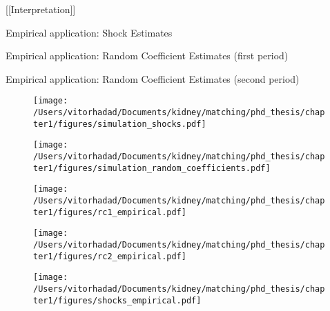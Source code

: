 [[Interpretation]]

\begin{table}[H]
  \singlespacing
  \caption{Empirical application: Shock Estimates}
  
\end{table}

\begin{table}[H]
  \singlespacing
  \caption{Empirical application: Random Coefficient Estimates (first period)}
  
\end{table}

\begin{table}[H]
  \singlespacing
  \caption{Empirical application: Random Coefficient Estimates (second period)}
  
\end{table}




\begin{figure}
  \centering
  \texttt{[image: /Users/vitorhadad/Documents/kidney/matching/phd\_thesis/chapter1/figures/simulation\_shocks.pdf]}
  \label{fig:simulation_shocks}
\end{figure}

\begin{figure}
  \centering
  \texttt{[image: /Users/vitorhadad/Documents/kidney/matching/phd\_thesis/chapter1/figures/simulation\_random\_coefficients.pdf]}
  \label{fig:simulation_random_coefficients}
\end{figure}


\begin{figure}
  \centering
  \texttt{[image: /Users/vitorhadad/Documents/kidney/matching/phd\_thesis/chapter1/figures/rc1\_empirical.pdf]}
\end{figure}

\begin{figure}
  \centering
  \texttt{[image: /Users/vitorhadad/Documents/kidney/matching/phd\_thesis/chapter1/figures/rc2\_empirical.pdf]}
\end{figure}


\begin{figure}
  \centering
  \texttt{[image: /Users/vitorhadad/Documents/kidney/matching/phd\_thesis/chapter1/figures/shocks\_empirical.pdf]}
\end{figure}


\clearpage

